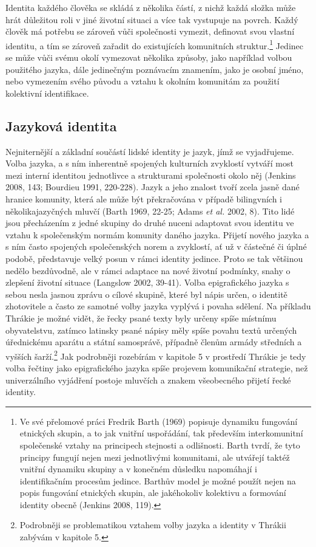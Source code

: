 Identita každého člověka se skládá z několika částí, z nichž každá složka může hrát důležitou roli v jiné životní situaci a více tak vystupuje na povrch. Každý člověk má potřebu se zároveň vůči společnosti vymezit, definovat svou vlastní identitu, a tím se zároveň zařadit do existujících komunitních struktur.\footnote{Ve své přelomové práci Fredrik Barth (1969) popisuje dynamiku fungování etnických skupin, a to jak vnitřní uspořádání, tak především interkomunitní společenské vztahy na principech stejnosti a odlišnosti. Barth tvrdí, že tyto principy fungují nejen mezi jednotlivými komunitami, ale utvářejí taktéž vnitřní dynamiku skupiny a v konečném důsledku napomáhají i identifikačním procesům jedince. Barthův model je možné použít nejen na popis fungování etnických skupin, ale jakéhokoliv kolektivu a formování identity obecně (Jenkins 2008, 119).} Jedinec se může vůči svému okolí vymezovat několika způsoby, jako například volbou použitého jazyka, dále jedinečným poznávacím znamením, jako je osobní jméno, nebo vymezením svého původu a vztahu k okolním komunitám za použití kolektivní identifikace.

\subsection[jazyková-identita]{Jazyková identita}

Nejniternější a základní součástí lidské identity je jazyk, jímž se vyjadřujeme. Volba jazyka, a s ním inherentně spojených kulturních zvyklostí vytváří most mezi interní identitou jednotlivce a strukturami společnosti okolo něj (Jenkins 2008, 143; Bourdieu 1991, 220-228). Jazyk a jeho znalost tvoří zcela jasně dané hranice komunity, která ale může být překračována v případě bilingvních i několikajazyčných mluvčí (Barth 1969, 22-25; Adams {\em et al.} 2002, 8). Tito lidé jsou přecházením z jedné skupiny do druhé nuceni adaptovat svou identitu ve vztahu k společenským normám komunity daného jazyka. Přijetí nového jazyka a s ním často spojených společenských norem a zvyklostí, ať už v částečné či úplné podobě, představuje velký posun v rámci identity jedince. Proto se tak většinou nedělo bezdůvodně, ale v rámci adaptace na nové životní podmínky, snahy o zlepšení životní situace (Langslow 2002, 39-41). Volba epigrafického jazyka s sebou nesla jasnou zprávu o cílové skupině, které byl nápis určen, o identitě zhotovitele a často ze samotné volby jazyka vyplývá i povaha sdělení. Na příkladu Thrákie je možné vidět, že řecky psané texty byly určeny spíše místnímu obyvatelstvu, zatímco latinsky psané nápisy měly spíše povahu textů určených úřednickému aparátu a státní samosprávě, případně členům armády středních a vyšších šarží.\footnote{Podrobněji se problematikou vztahem volby jazyka a identity v Thrákii zabývám v kapitole 5.} Jak podrobněji rozebírám v kapitole 5 v prostředí Thrákie je tedy volba řečtiny jako epigrafického jazyka spíše projevem komunikační strategie, než univerzálního vyjádření postoje mluvčích a znakem všeobecného přijetí řecké identity.

